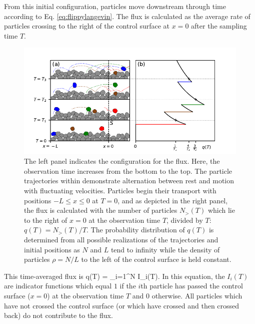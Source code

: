 From this initial configuration, particles move downstream through time according to Eq. \ref{eq:flippylangevin}.
The flux is calculated as the average rate of particles crossing to the right of the control surface at $x=0$ after the sampling time $T$.
\begin{figure}
	\centerline{\includegraphics{./figures/ch2/figure1.pdf}}
	\caption{The left panel indicates the configuration for the flux. Here, the observation time increases from the bottom to the top. The particle trajectories within demonstrate alternation between rest and motion with fluctuating velocities. Particles begin their transport with positions $-L\leq x \leq 0$ at $T=0$, and as depicted in the right panel, the flux is calculated with the number of particles $N_>(T)$ which lie to the right of $x=0$ at the observation time $T$, divided by $T$: $q(T) = N_>(T)/T$. The probability distribution of $q(T)$ is determined from all possible realizations of the trajectories and initial positions as $N$ and $L$ tend to infinity while the density of particles $\rho=N/L$ to the left of the control surface is held constant.}
	\label{fig:flipflopfig1}
\end{figure}
This time-averaged flux is
\be q(T) = \sum_{i=1}^N I_i(T). \label{eq:flippyflux} \ee
In this equation, the $I_i(T)$ are indicator functions which equal $1$ if the $i$th particle has passed the control surface ($x=0$) at the observation time $T$ and $0$ otherwise.
All particles which have not crossed the control surface (or which have crossed and then crossed back) do not contribute to the flux.

